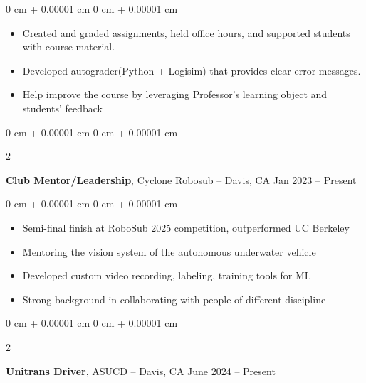 \documentclass[10pt, letterpaper]{article}
\newenvironment{highlights}{
    \begin{itemize}[
        topsep=0.10 cm,
        parsep=0.10 cm,
        partopsep=0pt,
        itemsep=0pt,
        leftmargin=0 cm + 10pt
    ]
}{
    \end{itemize}
} %
\newenvironment{onecolentry}{
    \begin{adjustwidth}{
        0 cm + 0.00001 cm
    }{
        0 cm + 0.00001 cm
    }
}{
    \end{adjustwidth}
} %
\newenvironment{twocolentry}[2][]{
    \onecolentry
    \def\secondColumn{#2}
    \setcolumnwidth{\fill, 6 cm}
    \begin{paracol}{2}
}{
    \switchcolumn \raggedleft \secondColumn
    \end{paracol}
    \endonecolentry
} %
\begin{document}
        \vspace{0.10 cm}
        \begin{onecolentry}
            \begin{highlights}
                \item Created and graded assignments, held office hours, and supported students with course material.
                \item Developed autograder(Python + Logisim) that provides clear error messages.
                \item Help improve the course by leveraging Professor's learning object and students' feedback

            \end{highlights}
        \end{onecolentry}


        \vspace{0.2 cm}

        \begin{twocolentry}{
            Jan 2023 – Present
        }
            \textbf{Club Mentor/Leadership}, Cyclone Robosub -- Davis, CA\end{twocolentry}

        \vspace{0.10 cm}
        \begin{onecolentry}
            \begin{highlights}
                \item Semi-final finish at RoboSub 2025 competition, outperformed UC Berkeley
                \item Mentoring the vision system of the autonomous underwater vehicle
                \item Developed custom video recording, labeling, training tools for ML 
                \item Strong background in collaborating with people of different discipline

            \end{highlights}
        \end{onecolentry}


        \vspace{0.2 cm}

        \begin{twocolentry}{
            June 2024 – Present
        }
            \textbf{Unitrans Driver}, ASUCD -- Davis, CA\end{twocolentry}
\end{document}
